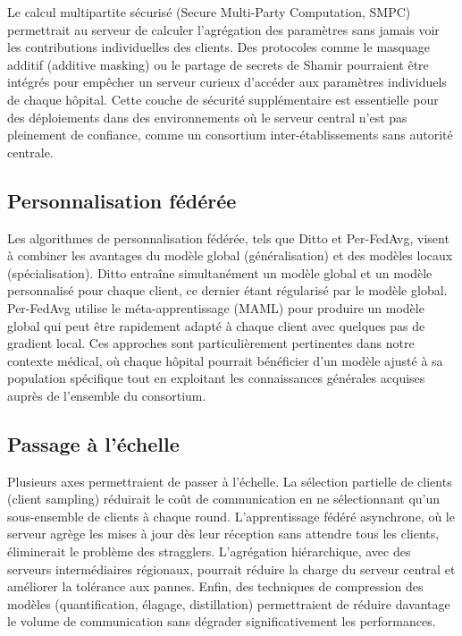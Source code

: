 \documentclass[12pt,a4paper]{report}
\begin{document}
Le calcul multipartite s\'{e}curis\'{e} (Secure Multi-Party Computation, SMPC) permettrait au serveur de calculer l'agr\'{e}gation des param\`{e}tres sans jamais voir les contributions individuelles des clients. Des protocoles comme le masquage additif (additive masking) ou le partage de secrets de Shamir pourraient \^{e}tre int\'{e}gr\'{e}s pour emp\^{e}cher un serveur curieux d'acc\'{e}der aux param\`{e}tres individuels de chaque h\^{o}pital. Cette couche de s\'{e}curit\'{e} suppl\'{e}mentaire est essentielle pour des d\'{e}ploiements dans des environnements o\`{u} le serveur central n'est pas pleinement de confiance, comme un consortium inter-\'{e}tablissements sans autorit\'{e} centrale.

\subsection{Personnalisation f\'{e}d\'{e}r\'{e}e}

Les algorithmes de personnalisation f\'{e}d\'{e}r\'{e}e, tels que Ditto et Per-FedAvg, visent \`{a} combiner les avantages du mod\`{e}le global (g\'{e}n\'{e}ralisation) et des mod\`{e}les locaux (sp\'{e}cialisation). Ditto entra\^{i}ne simultan\'{e}ment un mod\`{e}le global et un mod\`{e}le personnalis\'{e} pour chaque client, ce dernier \'{e}tant r\'{e}gularis\'{e} par le mod\`{e}le global. Per-FedAvg utilise le m\'{e}ta-apprentissage (MAML) pour produire un mod\`{e}le global qui peut \^{e}tre rapidement adapt\'{e} \`{a} chaque client avec quelques pas de gradient local. Ces approches sont particuli\`{e}rement pertinentes dans notre contexte m\'{e}dical, o\`{u} chaque h\^{o}pital pourrait b\'{e}n\'{e}ficier d'un mod\`{e}le ajust\'{e} \`{a} sa population sp\'{e}cifique tout en exploitant les connaissances g\'{e}n\'{e}rales acquises aupr\`{e}s de l'ensemble du consortium.

\subsection{Passage \`{a} l'\'{e}chelle}

Plusieurs axes permettraient de passer \`{a} l'\'{e}chelle. La s\'{e}lection partielle de clients (client sampling) r\'{e}duirait le co\^{u}t de communication en ne s\'{e}lectionnant qu'un sous-ensemble de clients \`{a} chaque round. L'apprentissage f\'{e}d\'{e}r\'{e} asynchrone, o\`{u} le serveur agr\`{e}ge les mises \`{a} jour d\`{e}s leur r\'{e}ception sans attendre tous les clients, \'{e}liminerait le probl\`{e}me des stragglers. L'agr\'{e}gation hi\'{e}rarchique, avec des serveurs interm\'{e}diaires r\'{e}gionaux, pourrait r\'{e}duire la charge du serveur central et am\'{e}liorer la tol\'{e}rance aux pannes. Enfin, des techniques de compression des mod\`{e}les (quantification, \'{e}lagage, distillation) permettraient de r\'{e}duire davantage le volume de communication sans d\'{e}grader significativement les performances.
\end{document}
